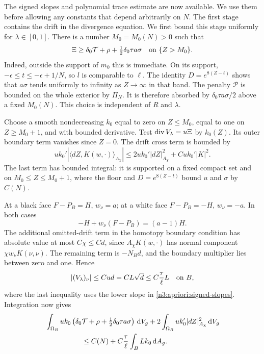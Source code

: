 The signed slopes and polynomial trace estimate are now available.
We use them before allowing any constants that depend arbitrarily on
$N$. The first stage contains the drift in the divergence equation. We first
bound this stage uniformly for $\lambda\in[0,1]$.
There is a number $M_0=M_0(N)>0$ such that
\begin{equation}
 \Xi\ge\delta_0\mathcal T+\rho+
                      \tfrac12\delta_0\tau a\sigma
          \quad\hbox{on }\{Z>M_0\}.
 \label{n3:apriori:high-source}
\end{equation}
Indeed, outside the support of $m_0$ this is immediate.  On its
support, $-\epsilon\le t\le-\epsilon+1/N$, so $l$ is comparable
to $\ell$.  The identity $D=e^{8(Z-t)}$ shows that $a\sigma$ tends
uniformly to infinity as $Z\to\infty$ in that band.  The penalty
$\mathcal P$ is bounded on the whole exterior by $\Pi_N$.
It is therefore absorbed by $\delta_0\tau a\sigma/2$ above a fixed
$M_0(N)$.  This choice is independent of $R$ and $\lambda$.

Choose a smooth nondecreasing $k_0$ equal to zero on $Z\le M_0$,
equal to one on $Z\ge M_0+1$, and with bounded derivative.  Test
$\operatorname{div} V_\lambda=u\Xi$ by $k_0(Z)$.  Its outer boundary term
vanishes since $Z=0$.  The drift cross term is bounded by
\[
 u k_0'\left|\langle dZ,K(w,\cdot)\rangle_{A_\chi}\right|
 \le 2u k_0'|dZ|_{A_\chi}^2+C u k_0'|K|^2.
\]
The last term has bounded integral: it is supported on a fixed
compact set and on $M_0\le Z\le M_0+1$, where the floor and
$D=e^{8(Z-t)}$ bound $u$ and $\sigma$ by $C(N)$.

At a black face $F-P_B=H$, $w_\nu=a$; at a white face
$F-P_B=-H$, $w_\nu=-a$.  In both cases
\[
 -H+w_\nu(F-P_B)=(a-1)H.
\]
The additional omitted-drift term in the homotopy boundary condition
has absolute value at most $C\chi\le Cd$, since
$A_\chi K(w,\cdot)$ has normal component
$\chi w_\nu K(\nu,\nu)$.  The remaining term is $-N_Bd$, and the
boundary multiplier lies between zero and one.  Hence
\begin{equation}
 |(V_\lambda)_\nu|\le Cud=CL\sqrt d
                       \le C\frac\tau\ell L\quad\hbox{on }B,
 \label{n3:apriori:small-boundary-flux}
\end{equation}
where the last inequality uses the lower slope in
\eqref{n3:apriori:signed-slopes}.  Integration now gives
\begin{align}
 &\int_{\Omega_R}u k_0
       \left(\delta_0\mathcal T+\rho+
                      \tfrac12\delta_0\tau a\sigma\right)\dd V_g
       +2\int_{\Omega_R}u k_0'|dZ|_{A_\chi}^2\dd V_g\notag\\
 &\hspace{18mm}\le C(N)+C\frac\tau\ell
                                  \int_B Lk_0\dd A_g.
 \label{n3:apriori:high-energy-before-trace}
\end{align}

